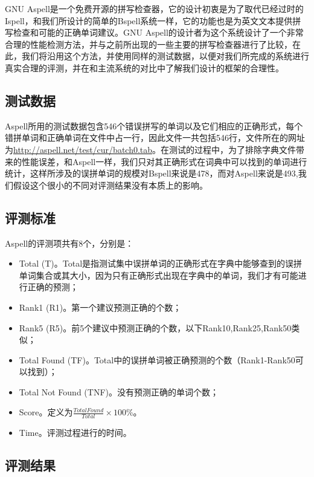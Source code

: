 \documentclass[UTF8,a4paper]{ctexart}
\begin{document}
GNU Aspell\cite{atkinson2011gnu}是一个免费开源的拼写检查器，它的设计初衷是为了取代已经过时的Ispell\cite{gorin19712003}，和我们所设计的简单的Bspell系统一样，它的功能也是为英文文本提供拼写检查和可能的正确单词建议。GNU Aspell的设计者为这个系统设计了一个非常合理的性能检测方法，并与之前所出现的一些主要的拼写检查器进行了比较，在此，我们将沿用这个方法，并使用同样的测试数据，以便对我们所完成的系统进行真实合理的评测，并在和主流系统的对比中了解我们设计的框架的合理性。

\subsection{测试数据}

Aspell所用的测试数据包含546个错误拼写的单词以及它们相应的正确形式，每个错拼单词和正确单词在文件中占一行，因此文件一共包括546行，文件所在的网址为\url{http://aspell.net/test/cur/batch0.tab}。在测试的过程中，为了排除字典文件带来的性能误差，和Aspell一样，我们只对其正确形式在词典中可以找到的单词进行统计，这样所涉及的误拼单词的规模对Bspell来说是478，而对Aspell来说是493,我们假设这个很小的不同对评测结果没有本质上的影响。

\subsection{评测标准}

Aspell的评测项共有8个，分别是：

\begin{itemize}
\item Total (T)。Total是指测试集中误拼单词的正确形式在字典中能够查到的误拼单词集合或其大小，因为只有正确形式出现在字典中的单词，我们才有可能进行正确的预测；
\item Rank1 (R1)。第一个建议预测正确的个数；
\item Rank5 (R5)。前5个建议中预测正确的个数，以下Rank10,Rank25,Rank50类似；
\item Total Found (TF)。Total中的误拼单词被正确预测的个数（Rank1-Rank50可以找到）；
\item Total Not Found (TNF)。没有预测正确的单词个数；
\item Score。定义为$\frac{Total Found}{Total} \times 100\%$。
\item Time。评测过程进行的时间。
\end{itemize}

\subsection{评测结果}
\end{document}
